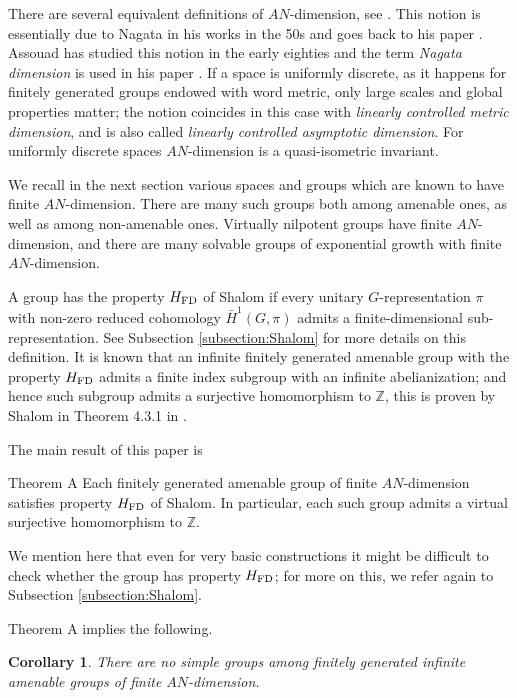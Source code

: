 \documentclass{amsart}
\numberwithin{figure}{section}
\theoremstyle{plain}
\newcommand{\thistheoremname}{}
\newtheorem*{genericthm*}{\thistheoremname}
\newenvironment{namedthm*}[1]
{\renewcommand{\thistheoremname}{#1}%
	\begin{genericthm*}}
	{\end{genericthm*}}
\newtheorem{corol}[thm]{Corollary}
\theoremstyle{definition}
\begin{document}
  

There are several equivalent definitions of $AN$-dimension, see \cite{BellDranishnikovBedlewo}.
This notion is essentially due to Nagata in his works in the 50s and 
	goes back to his paper \cite{Nagata58}. Assouad has studied this notion in the early eighties 
	and the term {\it Nagata dimension} is used in  his paper \cite{Assouad82}. 
	If a space is uniformly discrete, as it happens for finitely generated groups endowed with word metric,  only large scales
	and global properties matter; the notion coincides in this case with {\it linearly  controlled metric dimension}, and is also called
	{\it linearly controlled asymptotic dimension}. For uniformly discrete
	spaces $AN$-dimension is a quasi-isometric invariant.

    
We recall in the next section various	 
 spaces and groups which are known to have finite $AN$-dimension. 
 There are many such groups both among amenable ones, as well as among non-amenable ones.
 Virtually nilpotent groups have finite $AN$-dimension, and there are many solvable groups of exponential growth with finite $AN$-dimension.

A group has  the property $H_{\rm FD}$ of Shalom
if every unitary $G$-representation $\pi$ with non-zero reduced cohomology
$\bar{H}^1(G,\pi)$ admits a finite-dimensional sub-representation.
See Subsection \ref{subsection:Shalom} for more details on this definition.
It is known that an infinite finitely generated amenable  group with the property $H_{\rm FD}$ admits a  finite index subgroup with an infinite abelianization; and hence such subgroup admits a surjective homomorphism to $\mathbb{Z}$, this is proven by Shalom in   Theorem 4.3.1 in \cite{shalom}.

The main result of this paper is
\begin{namedthm*}{Theorem A}
Each finitely generated amenable group of finite $AN$-dimension satisfies property $H_{\rm FD}$ of Shalom. In particular, each such group admits a virtual surjective homomorphism to $\mathbb{Z}$.
\end{namedthm*}

We mention here that even for very basic constructions it might be difficult to check whether the group has property $H_{\rm FD}$; for more on this, we refer again to Subsection \ref{subsection:Shalom}.

Theorem A implies the following.
\begin{corol}\label{corol:simplegroups}
There are no simple groups among finitely generated infinite amenable groups of finite $AN$-dimension.
\end{corol}
\end{document}

